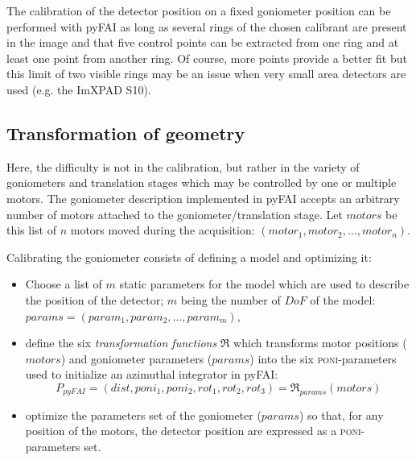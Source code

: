\documentclass[preprint]{iucr}              %
\begin{document}
The calibration of the detector position on a fixed goniometer position can be
performed with pyFAI as long as several rings of the chosen calibrant are
present in the image and that five control points can be extracted from one
ring and at least one point from another ring. 
Of course, more points provide a better fit but this limit of two visible rings 
may be an issue when very small area detectors are used (e.g. the ImXPAD S10).

\subsection{Transformation of geometry}

Here, the difficulty is not in the calibration, but rather in the
variety of goniometers and translation stages which may be controlled by one or 
multiple motors.
The goniometer description implemented in pyFAI accepts an
arbitrary number of motors attached to the goniometer/translation stage. 
Let $motors$ be this list of $n$ motors moved during the acquisition: 
$(motor_1, motor_2, \ldots, motor_n)$. 

Calibrating the goniometer consists of defining a model and optimizing it:
\begin{itemize}
  \item Choose a list of $m$ static parameters for the model which are used to describe the position of the detector;
  $m$ being the number of $DoF$ of the model:
  $params = (param_1, param_2, \ldots, param_m)$,
  \item define the six \textit{transformation functions} $\Re$ which transforms motor positions ($motors$)
  and goniometer parameters ($params$) into the six \textsc{poni}-parameters used to
  initialize an azimuthal integrator in pyFAI:
\begin{equation}
P_{pyFAI} = (dist, poni_1, poni_2, rot_1, rot_2, rot_3) = \Re_{params}(motors)
\end{equation}
  \item optimize the parameters set of the goniometer ($params$) so that,
  for any position of the motors, the detector position are expressed as
  a \textsc{poni}-parameters set.
\end{itemize}

\end{document}
